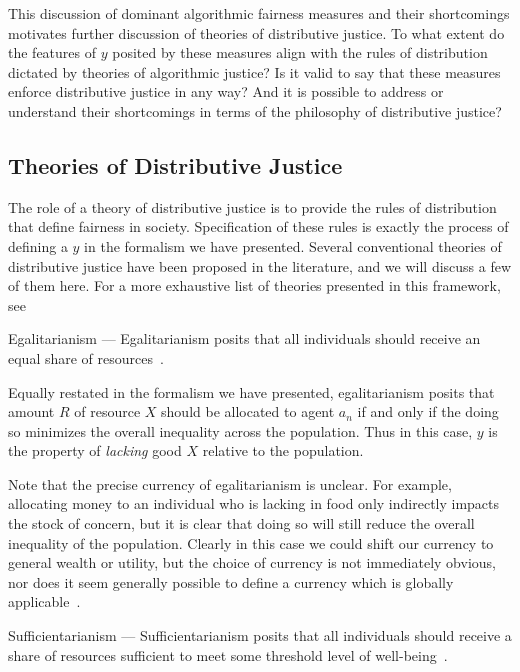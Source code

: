 This discussion of dominant algorithmic fairness measures and their shortcomings
motivates further discussion of theories of distributive justice. To what extent
do the features of $y$ posited by these measures align with the rules of
distribution dictated by theories of algorithmic justice? Is it valid to say 
that these measures enforce distributive justice in any way? And it is possible
to address or understand their shortcomings in terms of the philosophy of 
distributive justice?

\subsection{Theories of Distributive Justice}

The role of a theory of distributive justice is to provide the rules of
distribution that define fairness in society. Specification of these rules is
exactly the process of defining a $y$ in the formalism we have presented.
Several conventional theories of distributive justice have been proposed in the
literature, and we will discuss a few of them here. For a more exhaustive list
of theories presented in this framework, see~\cite{Kuppler_2021}

\begin{definition}
    Egalitarianism — Egalitarianism posits that all individuals should receive
    an equal share of resources~\cite{Rawls_1971}.
\end{definition}

Equally restated in the formalism we have presented, egalitarianism posits that
amount $R$ of resource $X$ should be allocated to agent $a_n$ if and only if
the doing so minimizes the overall inequality across the population. Thus in
this case, $y$ is the property of \textit{lacking} good $X$ relative to the
population.

Note that the precise currency of egalitarianism is unclear. For example,
allocating money to an individual who is lacking in food only indirectly impacts
the stock of concern, but it is clear that doing so will still reduce the
overall inequality of the population. Clearly in this case we could shift our 
currency to general wealth or utility, but the choice of currency is not
immediately obvious, nor does it seem generally possible to define a currency
which is globally applicable~\cite{Binns_2018}.

\begin{definition}
    Sufficientarianism — Sufficientarianism posits that all individuals should
    receive a share of resources sufficient to meet some threshold level of
    well-being~\cite{Sen_1979}.
\end{definition}

